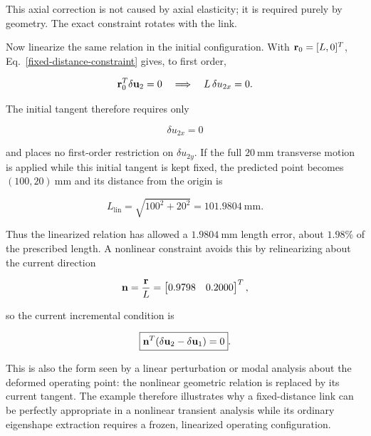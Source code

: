 This axial correction is not caused by axial elasticity; it is required purely
by geometry. The exact constraint rotates with the link.

Now linearize the same relation in the initial configuration. With
$\mathbf{r}_0=[L,0]^T$, Eq.~\eqref{fixed-distance-constraint} gives, to first
order,

\begin{equation}
    \mathbf{r}_0^T\delta\mathbf{u}_2=0
    \quad\Longrightarrow\quad
    L\,\delta u_{2x}=0.
\end{equation}

The initial tangent therefore requires only

\begin{equation}
    \delta u_{2x}=0
\end{equation}

and places no first-order restriction on $\delta u_{2y}$. If the full
$20~\mathrm{mm}$ transverse motion is applied while this initial tangent is kept
fixed, the predicted point becomes $(100,20)~\mathrm{mm}$ and its distance from
the origin is

\begin{equation}
    L_{\mathrm{lin}}=\sqrt{100^2+20^2}=101.9804~\mathrm{mm}.
\end{equation}

Thus the linearized relation has allowed a $1.9804~\mathrm{mm}$ length error,
about $1.98\%$ of the prescribed length. A nonlinear constraint avoids this by
relinearizing about the current direction

\begin{equation}
    \mathbf{n}=\frac{\mathbf{r}}{L}
    =\begin{bmatrix}0.9798&0.2000\end{bmatrix}^{T},
\end{equation}

so the current incremental condition is

\begin{equation}
    \boxed{\mathbf{n}^T(\delta\mathbf{u}_2-\delta\mathbf{u}_1)=0}.
\end{equation}

This is also the form seen by a linear perturbation or modal analysis about the
deformed operating point: the nonlinear geometric relation is replaced by its
current tangent. The example therefore illustrates why a fixed-distance link can
be perfectly appropriate in a nonlinear transient analysis while its ordinary
eigenshape extraction requires a frozen, linearized operating configuration.

